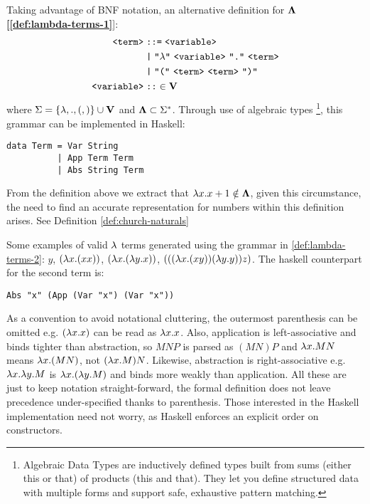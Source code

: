 \documentclass[12pt]{book}
\newcommand{\myref}[1]{\textcolor{refcolor}{\textbf{[\hyperref[#1]{\ref*{#1}}}]}}
\begin{document}
\begin{definition} Taking advantage of BNF notation, an alternative definition for $\mathbf{\Lambda}$ \myref{def:lambda-terms-1}:
  \label{def:lambda-terms-2}
  \begin{align*}
    \texttt{<term>} &\;\texttt{::=}\; \texttt{<variable>} \\
                    &\;\texttt{|}\; \texttt{"$\la$"}\ \texttt{<variable>}\ \texttt{"."}\ \texttt{<term>} \\
                    &\;\texttt{|}\; \texttt{"("}\ \texttt{<term>}\ \texttt{<term>}\ \texttt{")"} \\
    \texttt{<variable>} &\;\texttt{::}\in \Vset
  \end{align*}
  where \( \Sigma = \{ \lambda, ., (, )\} \cup \mathbf{V} \) and \( \mathbf{\Lambda} \subset \Sigma^* \). Through use of algebraic types \footnote{Algebraic Data Types are inductively defined types built from sums (either this or that) of products (this and that). They let you define structured data with multiple forms and support safe, exhaustive pattern matching. }, this grammar can be implemented in Haskell:
  \begin{lstlisting}[style=haskellstyle,caption={Grammar implementation of the \lcalc \ language using Haskell's algebraic types}]
data Term = Var String
          | App Term Term
          | Abs String Term
\end{lstlisting}

\end{definition}
\begin{remark}
  From the definition above we extract that \( \lambda x . x + 1 \notin \mathbf{\Lambda} \), given this circumstance, the need to find an accurate representation for numbers within this definition arises. See Definition \ref{def:church-naturals}
\end{remark}
\begin{example} \label{ex:lambda-terms} Some examples of valid $\lambda$ terms generated using the grammar in \ref{def:lambda-terms-2}:
  \( y \),
  \( (\lambda x. (x x)) \),
  \( (\lambda x. (\lambda y. x)) \),
  \( (((\lambda x. (x y)) (\lambda y. y)) z) \).
  The haskell counterpart for the second term is:
  \begin{lstlisting}[style=haskellstyle,caption={Haskell interpretation of the second term}]
Abs "x" (App (Var "x") (Var "x"))
  \end{lstlisting}
\end{example}
As a convention to avoid notational cluttering, the outermost parenthesis can be omitted e.g. $ ( \lambda x.x ) $ can be read as $ \lambda x.x $. Also, application is left-associative  and binds tighter than abstraction, so $M N P$ is parsed as $(M N) P$ and $\lambda x . M N$ means $\lambda x . (M N)$, not $(\lambda x . M) N$. Likewise, abstraction is right-associative e.g. $\lambda x . \lambda y . M$ is $\lambda x . (\lambda y . M)$ and binds more weakly than application. All these are just to keep notation straight-forward, the formal definition does not leave precedence under-specified thanks to parenthesis. Those interested in the Haskell implementation need not worry, as Haskell enforces an explicit order on constructors.
\end{document}
